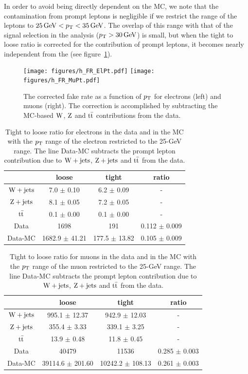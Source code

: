 In order to avoid being directly dependent on the MC, we note that the
contamination from prompt leptons is negligible if we restrict the \pt range
of the leptons to $\unit[25]{GeV} < \pt < \unit[35]{GeV}$. The overlap of
this \pt range with that of the signal selection in the analysis ($\pt >
\unit[30]{GeV}$) is small, but when the tight to loose ratio is corrected
for the contribution of prompt leptons, it becomes nearly independent from
the \pt (see figure~\ref{fig:CorFRvsLepPt}).
\begin{figure}[htb]
    \centering
\texttt{[image: figures/h\_FR\_ElPt.pdf]} \hfill
\texttt{[image: figures/h\_FR\_MuPt.pdf]} \\ 
\caption{The corrected fake rate as a function of $p_\mathrm{T}$ for electrons (left) and muons (right). The correction is accomplished by subtracting the MC-based 
         $\mathrm{W}$, $\mathrm{Z}$ and $\mathrm{t}\bar{\mathrm{t}}$ contributions from the data.}
\label{fig:CorFRvsLepPt}
\end{figure}
\begin{table}[htb]
    \centering
\begin{tabular}{*4c}
    \toprule
 & 	 loose & 	 tight & 	 ratio \\
 \midrule
$\mathrm{W} + \text{jets}$ & 	 7.0 $\pm$ 0.10 & 	 6.2 $\pm$ 0.09 & 	- \\
$\mathrm{Z} + \text{jets}$ & 	 8.1 $\pm$ 0.05 & 	 7.2 $\pm$ 0.05 & 	- \\
$\mathrm{t}\bar{\mathrm{t}}$ & 	 0.1 $\pm$ 0.00 & 	 0.1 $\pm$ 0.00 & 	- \\
\midrule
Data & 	 1698 & 	  191 & 	0.112 $\pm$ 0.009 \\
Data-MC &	1682.9 $\pm$ 41.21 & 	177.5 $\pm$ 13.82 & 	0.105 $\pm$ 0.009 \\
\bottomrule
\end{tabular}
\caption{Tight to loose ratio for electrons in the data and in the MC with
    the $p_\mathrm{T}$ range of
    the electron restricted to the 25-\unit[35]{GeV} range.
The line Data-MC subtracts the prompt lepton contribution due to $\mathrm{W} + \text{jets}$,
$\mathrm{Z} + \text{jets}$ and $\mathrm{t}\bar{\mathrm{t}}$ from the data.}
\label{tab:FRwMCEl_Pt2535}
\end{table}


\begin{table}[htb]
    \centering
\begin{tabular}{*4c}
    \toprule
 & 	 loose & 	 tight & 	 ratio \\
 \midrule
$\mathrm{W} + \text{jets}$ & 	995.1 $\pm$ 12.37 & 	942.9 $\pm$ 12.03 & 	- \\
$\mathrm{Z} + \text{jets}$ & 	355.4 $\pm$ 3.33 & 	339.1 $\pm$ 3.25 & 	- \\
$\mathrm{t}\bar{\mathrm{t}}$ & 	13.9 $\pm$ 0.48 & 	11.8 $\pm$ 0.45 & 	- \\
\midrule
Data & 	40479 & 	11536 & 	0.285 $\pm$ 0.003 \\
Data-MC &	39114.6 $\pm$ 201.60 & 	10242.2 $\pm$ 108.13 & 	0.261 $\pm$ 0.003 \\
\bottomrule
\end{tabular}
\caption{Tight to loose ratio for muons in the data and in the MC with the
    $p_\mathrm{T}$ range of the muon restricted to the 25-\unit[35]{GeV} range. 
The line Data-MC subtracts the prompt lepton contribution due to $\mathrm{W} + \text{jets}$,
$\mathrm{Z} + \text{jets}$ and $\mathrm{t}\bar{\mathrm{t}}$ from the data.}
\label{tab:FRwMCMu_Pt2535}
\end{table}

